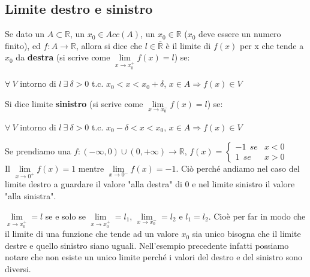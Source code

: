 \subsection{Limite destro e sinistro}
\begin{definition}
    Se dato un $A \subset \mathbb{R}$, un $x_0 \in Acc(A)$, un $x_0 \in \mathbb{R}$ ($x_0$ deve essere un numero finito), ed  $f: A \to \mathbb{R}$, allora si dice che $l \in \overline{\mathbb{R}}$ è il limite di $f(x)$ per x che tende a $x_0$ da \textbf{destra} (si scrive come $\lim\limits_{x\to x_0^+}f(x) = l$) se:
    \begin{center}
        $\forall \: V$ intorno di $l \: \exists \: \delta > 0$ t.c. $x_0 < x < x_0 + \delta$, $x \in A \Longrightarrow f(x) \in V$
    \end{center}
    Si dice limite \textbf{sinistro} (si scrive come $\lim\limits_{x\to x_0^-}f(x) = l$) se:
    \begin{center}
        $\forall \: V$ intorno di $l \: \exists \: \delta > 0$ t.c. $x_0 - \delta < x < x_0$, $x \in A \Longrightarrow f(x) \in V$
    \end{center}
\end{definition}
\begin{example}
Se prendiamo una $f: (-\infty, 0) \cup (0, +\infty) \to \mathbb{R}$, 
$f(x) = 
    \begin{cases}
        -1 \: \: se & x < 0 \\
        1 \: \: se & x > 0
    \end{cases}
    $ \\ 
    Il $\lim\limits_{x \to 0^+} f(x) = 1$ mentre $\lim\limits_{x \to 0^-} f(x) = -1$. Ciò perché andiamo nel caso del limite destro a guardare il valore "alla destra" di 0 e nel limite sinistro il valore "alla sinistra".
\end{example}
\begin{observation}
$\lim\limits_{x \to x_0^+} = l$ se e solo se $\lim\limits_{x \to x_0^+} = l_1$, $\lim\limits_{x \to x_0^-} = l_2$ e $l_1 = l_2$. Cioè per far in modo che il limite di una funzione che tende ad un valore $x_0$ sia unico bisogna che il limite destre e quello sinistro siano uguali. Nell'esempio precedente infatti possiamo notare che non esiste un unico limite perché i valori del destro e del sinistro sono diversi.
\end{observation}

